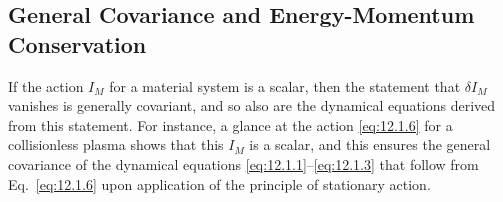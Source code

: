%

\subsection{General Covariance and Energy-Momentum Conservation}
\label{sec:12.3}

If the action \(I_M\) for a material system is a scalar, then the statement
that \(\delta I_M\) vanishes is generally covariant, and so also are the
dynamical equations derived from this statement. For instance, a glance at
the action \eqref{eq:12.1.6} for a collisionless plasma shows that this
\(I_M\) is a scalar, and this ensures the general covariance of the dynamical
equations \eqref{eq:12.1.1}--\eqref{eq:12.1.3} that follow from
Eq.~\eqref{eq:12.1.6} upon application of the principle of stationary action.

